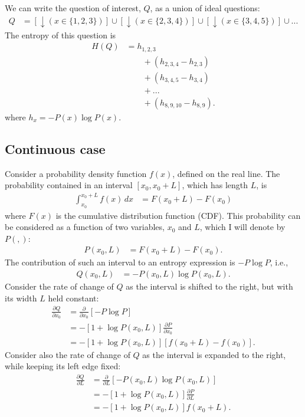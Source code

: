 \documentclass[entropy,article,accept,oneauthor,pdftex,10pt,a4paper]{mdpi}
\begin{document}
We can write the question of interest, $Q$, as a union of ideal questions:
\begin{align}
Q &= \left[\downarrow (x \in \{1, 2, 3\})\right] \cup
     \left[\downarrow (x \in \{2, 3, 4\})\right] \cup
     \left[\downarrow (x \in \{3, 4, 5\})\right] \cup ...
\end{align}
The entropy of this question is
\begin{align}
H(Q) &= h_{1,2,3}\\
     & \quad \quad + \left(h_{2,3,4} - h_{2,3}\right) \\
     & \quad \quad + \left(h_{3,4,5} - h_{3,4}\right) \\
     & \quad \quad + ... \\
     & \quad \quad + \left(h_{8,9,10} - h_{8,9}\right).
\end{align}
where $h_{x} = -P(x)\log P(x)$.

\subsection*{Continuous case}

Consider a probability density function $f(x)$, defined on the real
line. The probability contained in an interval
$[x_0, x_0 + L]$, which has length $L$, is
\begin{align}
\int_{x_0}^{x_0 + L} f(x) \, dx &= F(x_0 + L) - F(x_0)
\end{align}
where $F(x)$ is the cumulative distribution function (CDF).
This probability can be considered as a function of two variables,
$x_0$ and $L$, which I will denote by $P(,)$:
\begin{align}
P(x_0, L) &= F(x_0 + L) - F(x_0).
\end{align}
The contribution of such an interval to an entropy expression
is $-P\log P$, i.e.,
\begin{align}
Q(x_0, L) &= -P(x_0, L) \log P(x_0, L).
\end{align}
Consider the rate of change of $Q$ as the interval is shifted to
the right, but with its width $L$ held constant:
\begin{align}
\frac{\partial Q}{\partial x_0} &= \frac{\partial}{\partial x_0}
    \left[-P\log P\right] \\
    &= -\left[1 + \log P(x_0, L)\right]\frac{\partial P}{\partial x_0} \\
    &= -\left[1 + \log P(x_0, L)\right]\left[f(x_0 + L) - f(x_0)\right].
\end{align}
Consider also the rate of change of $Q$ as the interval is
expanded to the right, while keeping its left edge fixed:
\begin{align}
\frac{\partial Q}{\partial L} &= \frac{\partial}{\partial L}
    \left[-P(x_0, L) \log P(x_0, L)\right] \\
    &= -\left[1 + \log P(x_0, L)\right]\frac{\partial P}{\partial L} \\
    &= -\left[1 + \log P(x_0, L)\right]f(x_0 + L).
\end{align}
\end{document}
